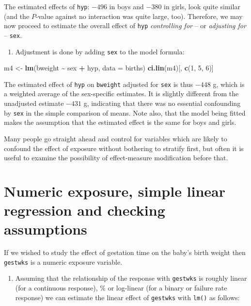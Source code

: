 \documentclass[
]{book}
\newenvironment{Shaded}{\begin{snugshade}}{\end{snugshade}}
\newcommand{\AttributeTok}[1]{\textcolor[rgb]{0.13,0.29,0.53}{#1}}
\newcommand{\DecValTok}[1]{\textcolor[rgb]{0.00,0.00,0.81}{#1}}
\newcommand{\FunctionTok}[1]{\textcolor[rgb]{0.13,0.29,0.53}{\textbf{#1}}}
\newcommand{\NormalTok}[1]{#1}
\newcommand{\OtherTok}[1]{\textcolor[rgb]{0.56,0.35,0.01}{#1}}
\newcommand{\SpecialCharTok}[1]{\textcolor[rgb]{0.81,0.36,0.00}{\textbf{#1}}}
\providecommand{\tightlist}{%
  \setlength{\itemsep}{0pt}\setlength{\parskip}{0pt}}
\begin{document}
The estimated effects of \texttt{hyp}:
\(-496\) in boys and \(-380\) in girls, look quite
similar (and the \(P\)-value against no interaction was quite large, too).
Therefore, we may now proceed to estimate the overall effect of \texttt{hyp}
\emph{controlling for} -- or \emph{adjusting for} -- \texttt{sex}.

\begin{enumerate}
\def\labelenumi{\arabic{enumi}.}
\tightlist
\item
  Adjustment is done by adding \texttt{sex} to the model formula:
\end{enumerate}

\begin{Shaded}
\begin{Highlighting}[]
\NormalTok{m4 }\OtherTok{\textless{}{-}} \FunctionTok{lm}\NormalTok{(bweight }\SpecialCharTok{\textasciitilde{}}\NormalTok{ sex }\SpecialCharTok{+}\NormalTok{ hyp, }\AttributeTok{data =}\NormalTok{ births)}
\FunctionTok{ci.lin}\NormalTok{(m4)[, }\FunctionTok{c}\NormalTok{(}\DecValTok{1}\NormalTok{, }\DecValTok{5}\NormalTok{, }\DecValTok{6}\NormalTok{)]}
\end{Highlighting}
\end{Shaded}

The estimated effect of \texttt{hyp} on \texttt{bweight}
adjusted for \texttt{sex} is thus \(-448\) g,
which is a weighted average of the sex-specific estimates.
It is slightly different from the unadjusted estimate \(-431\) g, indicating
that there was no essential confounding by \texttt{sex} in the
simple comparison of means.
Note also, that the model being fitted makes the assumption that
the estimated effect is the same for boys and girls.

Many people go straight ahead and control for variables which are likely to
confound the effect of exposure without bothering to stratify first,
but often it is useful to examine the possibility of effect-measure
modification before that.

\section{Numeric exposure, simple linear regression and checking assumptions}\label{numeric-exposure-simple-linear-regression-and-checking-assumptions}

If we wished to study the effect of gestation time on the baby's birth
weight then \texttt{gestwks} is a numeric exposure variable.

\begin{enumerate}
\def\labelenumi{\arabic{enumi}.}
\tightlist
\item
  Assuming that the relationship
  of the response with \texttt{gestwks} is roughly linear
  (for a continuous response),
  \% or log-linear (for a binary or failure rate response)
  we can estimate the linear effect of \texttt{gestwks} with \texttt{lm()} as follows:
\end{enumerate}
\end{document}
